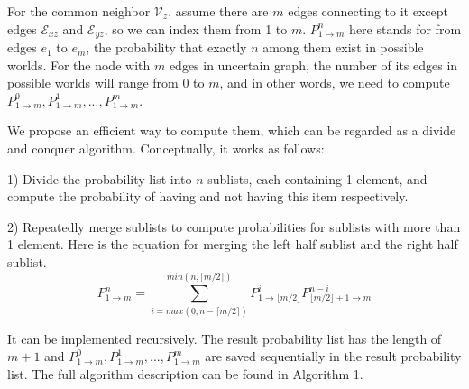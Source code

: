 \documentclass[\main/thesis.tex]{subfiles}
\begin{document}

For the common neighbor $\mathcal{V}_z$, assume there are $m$ edges connecting to it except edges $\mathcal{E}_{xz}$ and $\mathcal{E}_{yz}$, so we can index them from 1 to $m$. $P_{1\rightarrow m}^n$ here stands for from edges $e_1$ to $e_m$, the probability that exactly $n$ among them exist in possible worlds. For the node with $m$ edges in uncertain graph, the number of its edges in possible worlds will range from 0 to $m$, and in other words, we need to compute $P_{1\rightarrow m}^0, P_{1\rightarrow m}^1, ..., P_{1\rightarrow m}^m$. 

We propose an efficient way to compute them, which can be regarded as a divide and conquer algorithm. Conceptually, it works as follows:

1) Divide the probability list into $n$ sublists, each containing 1 element, and compute the probability of having and not having this item respectively.

2) Repeatedly merge sublists to compute probabilities for sublists with more than 1 element. Here is the equation for merging the left half sublist and the right half sublist.
\begin{equation}
P_{1\rightarrow m}^n=\sum_{i=max(0,n-\lceil m/2 \rceil)}^{min(n,\lfloor m/2 \rfloor)}P_{1\rightarrow{\lfloor m/2 \rfloor}}^i P_{{\lfloor m/2 \rfloor}+1\rightarrow m}^{n-i}
\label{divide-conquer-specific}
\end{equation}

It can be implemented recursively. The result probability list has the length of $m+1$ and $P_{1\rightarrow m}^0, P_{1\rightarrow m}^1, ..., P_{1\rightarrow m}^m$ are saved sequentially in the result probability list. The full algorithm description can be found in Algorithm 1.
\end{document}
